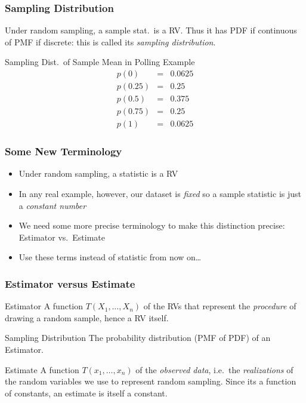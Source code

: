 \documentclass[handout]{beamer}
\begin{document}
\begin{frame}
  \frametitle{Sampling Distribution}
  Under random sampling, a sample stat.\ is a RV. Thus it has PDF if continuous of PMF if discrete: this is called its \emph{sampling distribution}. 

  \begin{block}{Sampling Dist.\ of Sample Mean in Polling Example}
   \begin{eqnarray*}
   p(0) &=&  0.0625\\
   p(0.25) &=&  0.25\\ 
   p(0.5) &=&  0.375\\
   p(0.75)&=& 0.25\\ 
   p(1) &=&  0.0625
   \end{eqnarray*}

  \end{block}
\end{frame}
\begin{frame}
  \frametitle{Some New Terminology}
  \begin{itemize}
    \item Under random sampling, a statistic is a RV
    \item In any real example, however, our dataset is \emph{fixed} so a sample statistic is just a \emph{constant number}
    \item We need some more precise terminology to make this distinction precise: \alert{Estimator} vs.\ \alert{Estimate}
    \item Use these terms instead of statistic from now on\dots \end{itemize}
\end{frame}

\begin{frame}
\frametitle{Estimator versus Estimate}

\begin{block}{Estimator}
  A function $T(X_1, \hdots, X_n)$ of the RVs that represent the \emph{procedure} of drawing a random sample, hence a RV itself.
\end{block}
\pause
\begin{block}{Sampling Distribution}
The probability distribution (PMF of PDF) of an Estimator. 
\end{block}
\pause
\begin{block}{Estimate}
A function $T(x_1, \hdots, x_n)$ of the \emph{observed data}, i.e.\ the \emph{realizations} of the random variables we use to represent random sampling. 
Since its a function of constants, an estimate is itself a constant.
\end{block}

\end{frame}
\end{document}
